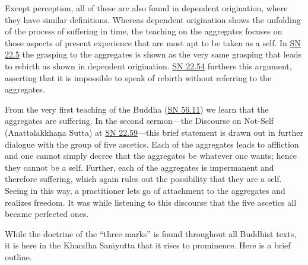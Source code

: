 \documentclass[12pt,openany]{book}%
\begin{document}
 Except perception, all of these are also found in dependent origination, where they have similar definitions. Whereas dependent origination shows the unfolding of the process of suffering in time, the teaching on the aggregates focuses on those aspects of present experience that are most apt to be taken as a self. In \href{https://suttacentral.net/sn22.5}{SN 22.5} the grasping to the aggregates is shown as the very same grasping that leads to rebirth as shown in dependent origination. \href{https://suttacentral.net/sn22.54}{SN 22.54} furthers this argument, asserting that it is impossible to speak of rebirth without referring to the aggregates.

From the very first teaching of the Buddha (\href{https://suttacentral.net/sn56.11}{SN 56.11}) we learn that the aggregates are suffering. In the second sermon—the Discourse on Not-Self (\textsanskrit{Anattalakkhaṇa} Sutta) at \href{https://suttacentral.net/sn22.59}{SN 22.59}—this brief statement is drawn out in further dialogue with the group of five ascetics. Each of the aggregates leads to affliction and one cannot simply decree that the aggregates be whatever one wants; hence they cannot be a self. Further, each of the aggregates is impermanent and therefore suffering, which again rules out the possibility that they are a self. Seeing in this way, a practitioner lets go of attachment to the aggregates and realizes freedom. It was while listening to this discourse that the five ascetics all became perfected ones.

While the doctrine of the “three marks” is found throughout all Buddhist texts, it is here in the Khandha \textsanskrit{Saṁyutta} that it rises to prominence. Here is a brief outline.
\end{document}
